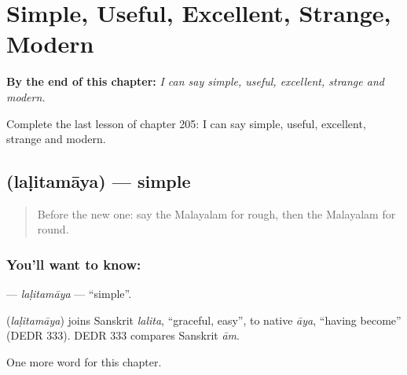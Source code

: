 
\chapter{Simple, Useful, Excellent, Strange, Modern}
\label{ch:ml-simple-useful-excellent-strange-modern}

\begin{chapteropening}
\textbf{By the end of this chapter:} \emph{I can say simple, useful, excellent, strange and modern.}

Complete the last lesson of chapter 205: I can say simple, useful, excellent, strange and modern.
\end{chapteropening}

\section[\texorpdfstring{\ml{ലളിതമായ} (laḷitamāya)}{ലളിതമായ (laḷitamāya)}]{ (laḷitamāya) — simple}

\label{lesson:ML-C205-lalitamaya}



\begin{quote}
Before the new one: say the Malayalam for rough, then the Malayalam for round.
\end{quote}

\subsection*{You'll want to know: }
\textbf{} — \emph{laḷitamāya} — \textquotedblleft{}simple\textquotedblright{}.

\begin{cousinweb}
\textbf{} (\emph{laḷitamāya}) joins Sanskrit \emph{lalita}, \textquotedblleft{}graceful, easy\textquotedblright{}, to native \emph{āya}, \textquotedblleft{}having become\textquotedblright{} (DEDR 333). DEDR 333 compares Sanskrit \emph{ām}.
\end{cousinweb}

\begin{grammarlens}[title={What you've built}]
One more word for this chapter.
\end{grammarlens}


